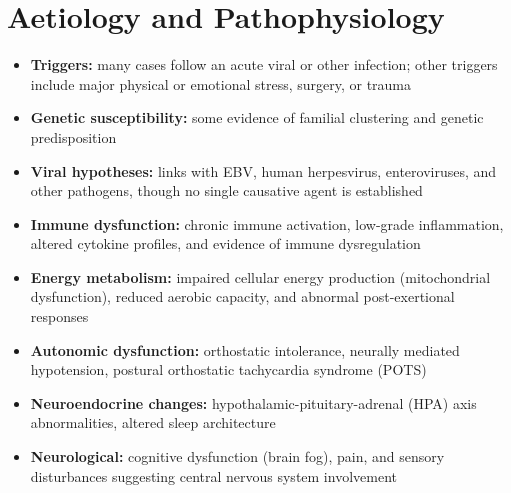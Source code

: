 \section*{Aetiology and Pathophysiology}
\begin{itemize}
    \item \textbf{Triggers:} many cases follow an acute viral or other infection; other triggers include major physical or emotional stress, surgery, or trauma
    \item \textbf{Genetic susceptibility:} some evidence of familial clustering and genetic predisposition
    \item \textbf{Viral hypotheses:} links with EBV, human herpesvirus, enteroviruses, and other pathogens, though no single causative agent is established
    \item \textbf{Immune dysfunction:} chronic immune activation, low-grade inflammation, altered cytokine profiles, and evidence of immune dysregulation
    \item \textbf{Energy metabolism:} impaired cellular energy production (mitochondrial dysfunction), reduced aerobic capacity, and abnormal post-exertional responses
    \item \textbf{Autonomic dysfunction:} orthostatic intolerance, neurally mediated hypotension, postural orthostatic tachycardia syndrome (POTS)
    \item \textbf{Neuroendocrine changes:} hypothalamic-pituitary-adrenal (HPA) axis abnormalities, altered sleep architecture
    \item \textbf{Neurological:} cognitive dysfunction (brain fog), pain, and sensory disturbances suggesting central nervous system involvement
\end{itemize}

